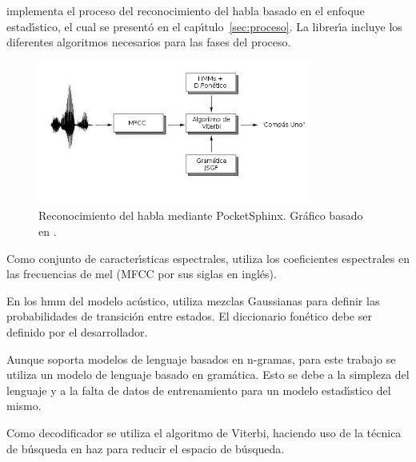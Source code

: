  implementa el proceso del reconocimiento del habla basado en el enfoque 
estad{\'\i}stico, el cual se present\'o en el cap{\'\i}tulo~\ref{sec:proceso}. La librer{\'\i}a incluye
los diferentes algoritmos necesarios para las fases del proceso.

\begin{figure}[H] 
\centering
\includegraphics[width=0.8\textwidth]{./graphics/pocketsphinx.png}
\caption{Reconocimiento del habla mediante PocketSphinx. Gr\'afico basado en \cite{VerenichASR}.}
\label{figure:proceso-pocketsphinx}
\end{figure}

Como conjunto de caracter{\'\i}sticas espectrales,  utiliza los coeficientes
espectrales en las frecuencias de mel (MFCC por sus siglas en ingl\'es).

En los \gls{hmm} del modelo ac\'ustico, utiliza mezclas Gaussianas para definir las probabilidades de 
transici\'on entre estados. El diccionario fon\'etico debe ser definido por el desarrollador.

Aunque  soporta modelos de lenguaje basados en n-gramas, para este trabajo 
se utiliza un modelo de lenguaje basado en gram\'atica. Esto se debe a la simpleza del lenguaje y a la 
falta de datos de entrenamiento para un modelo estad{\'\i}stico del mismo.

Como decodificador se utiliza el algoritmo de Viterbi, haciendo uso de la t\'ecnica de b\'usqueda en haz
para reducir el espacio de b\'usqueda.
